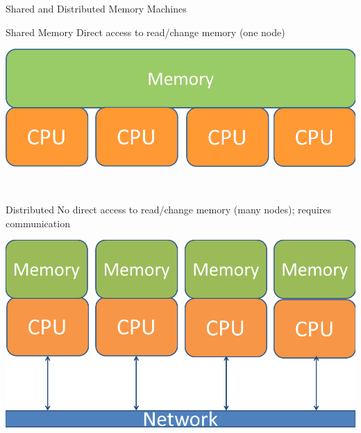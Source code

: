 \begin{frame}{Shared and Distributed Memory Machines}
   \begin{center}
    \begin{minipage}{.475\textwidth}
    \begin{block}{Shared Memory}
     Direct access to read/change memory (one node) \vspace{.3cm} \ 
      \begin{center}
      \includegraphics[width=.95\textwidth]{../common/pics/arch_shared}
      \end{center}
      \vspace{.3cm} \
    \end{block}
    \end{minipage}
    \hspace{.1cm}
    \begin{minipage}{.475\textwidth}
    \begin{block}{Distributed}
    No direct access to read/change memory (many nodes); requires communication
      \begin{center}
      \includegraphics[width=.95\textwidth]{../common/pics/arch_distributed}
      \end{center}
    \end{block}
    \end{minipage}
    \end{center}
\end{frame}


